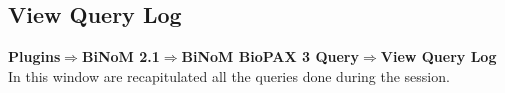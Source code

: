 \subsection{View Query Log}
\textbf{Plugins$\Rightarrow$BiNoM 2.1$\Rightarrow$BiNoM BioPAX 3 Query$\Rightarrow$View Query Log}\\
In this window are recapitulated all the queries done during the session.

